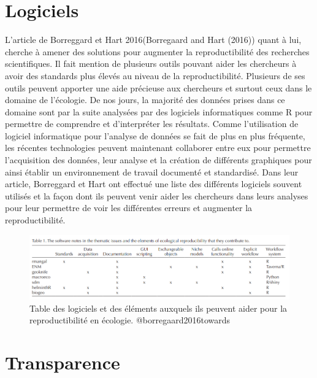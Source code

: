 \documentclass[9pt,twocolumn,twoside,]{pnas-new}
\begin{document}
\hypertarget{logiciels}{%
\section{Logiciels}\label{logiciels}}

L'article de Borreggard et Hart 2016(Borregaard and Hart (2016)) quant à
lui, cherche à amener des solutions pour augmenter la reproductibilité
des recherches scientifiques. Il fait mention de plusieurs outils
pouvant aider les chercheurs à avoir des standards plus élevés au niveau
de la reproductibilité. Plusieurs de ses outils peuvent apporter une
aide précieuse aux chercheurs et surtout ceux dans le domaine de
l'écologie. De nos jours, la majorité des données prises dans ce domaine
sont par la suite analysées par des logiciels informatiques comme R pour
permettre de comprendre et d'interpréter les résultats. Comme
l'utilisation de logiciel informatique pour l'analyse de données se fait
de plus en plus fréquente, les récentes technologies peuvent maintenant
collaborer entre eux pour permettre l'acquisition des données, leur
analyse et la création de différents graphiques pour ainsi établir un
environnement de travail documenté et standardisé. Dans leur article,
Borreggard et Hart ont effectué une liste des différents logiciels
souvent utilisés et la façon dont ils peuvent venir aider les chercheurs
dans leurs analyses pour leur permettre de voir les différentes erreurs
et augmenter la reproductibilité.

\begin{figure}
\centering
\includegraphics{Borregaard2016.png}
\caption{Table des logiciels et des éléments auxquels ils peuvent aider
pour la reproductibilité en écologie. @borregaard2016towards}
\end{figure}

\hypertarget{transparence}{%
\section{Transparence}\label{transparence}}
\end{document}
